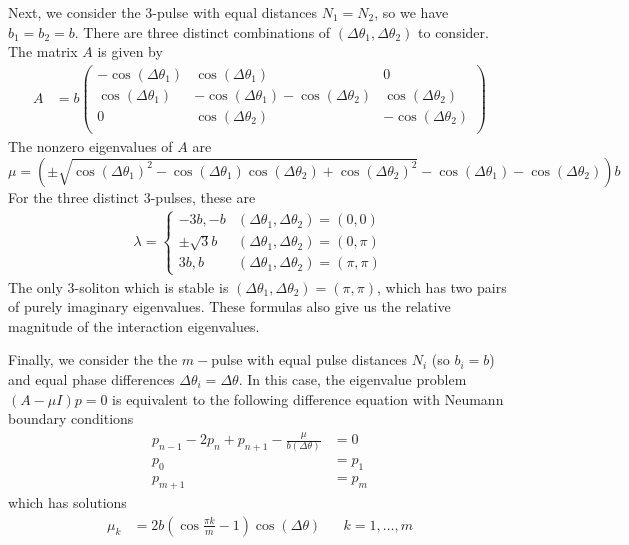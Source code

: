 \documentclass[12pt]{article}
\begin{document}
Next, we consider the 3-pulse with equal distances $N_1 = N_2$, so we have $b_1 = b_2 = b$. There are three distinct combinations of $(\Delta\theta_1, \Delta\theta_2)$ to consider. The matrix $A$ is given by
\begin{align*}
A &= b \begin{pmatrix}
-\cos(\Delta\theta_1) & \cos(\Delta\theta_1) & 0  \\
\cos(\Delta\theta_1) & -\cos(\Delta\theta_1) - \cos(\Delta\theta_2) & \cos(\Delta\theta_2) \\ 
0 & \cos(\Delta\theta_2) & -\cos(\Delta\theta_2) \\
\end{pmatrix}
\end{align*}
The nonzero eigenvalues of $A$ are
\[
\mu = \left( \pm\sqrt{\cos(\Delta\theta_1)^2 - \cos(\Delta\theta_1) \cos(\Delta\theta_2) + \cos(\Delta\theta_2)^2} - \cos(\Delta\theta_1) - \cos(\Delta\theta_2) \right)b
\]
For the three distinct 3-pulses, these are
\begin{align*}
\lambda = \begin{cases}
-3b, -b & (\Delta\theta_1, \Delta\theta_2) = (0, 0) \\
\pm \sqrt{3}b & (\Delta\theta_1, \Delta\theta_2) = (0, \pi) \\
3b, b & (\Delta\theta_1, \Delta\theta_2) = (\pi, \pi)
\end{cases}
\end{align*}
The only 3-soliton which is stable is $(\Delta\theta_1, \Delta\theta_2) = (\pi, \pi)$, which has two pairs of purely imaginary eigenvalues. These formulas also give us the relative magnitude of the interaction eigenvalues.

Finally, we consider the the $m-$pulse with equal pulse distances $N_i$ (so $b_i = b$) and equal phase differences $\Delta\theta_i = \Delta\theta$. In this case, the eigenvalue problem $(A - \mu I)p = 0$ is equivalent to the following difference equation with Neumann boundary conditions
\begin{equation*}
\begin{aligned}
p_{n-1} - 2 p_n + p_{n+1} - \frac{\mu}{b (\Delta\theta)} &= 0 \\
p_0 &= p_1 \\
p_{m+1} &= p_m
\end{aligned}
\end{equation*}
which has solutions
\begin{align*}
\mu_k &= 2 b \left( \cos\frac{\pi k}{m} - 1 \right) \cos (\Delta\theta) && k = 1, \dots, m
\end{align*}
\end{document}
